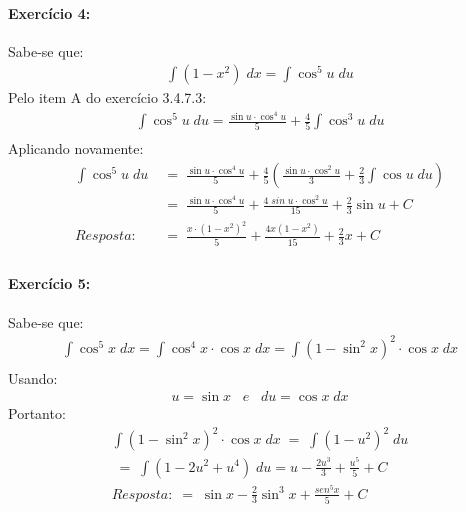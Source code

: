 \documentclass[12pt]{article}
\begin{document}

\paragraph{Exercício 4:}
Sabe-se que:
\begin{align*}\int \left ( 1-x^{2} \right )\; dx = \int \cos^{5}u\; du
\end{align*}
Pelo item A do exercício 3.4.7.3:
\begin{align*}\int \cos^{5}u\; du = \frac{\sin u \cdot \cos^{4}u}{5} + \frac{4}{5}\int\cos^{3}u \;du\\
\end{align*}
Aplicando novamente:
\begin{align*}\int \cos^{5}u\; du
&\;=\; \frac{\sin u \cdot \cos^{4}u}{5} + \frac{4}{5}\left (\frac{\sin u \cdot \cos^{2}u}{3}+\frac{2}{3}\int \cos u \;du  \right )\\
&\;=\; \frac{\sin u \cdot \cos^{4}u}{5} + \frac{4 \; sin\; u \cdot \cos^{2}u}{15}+\frac{2}{3} \sin u + C\\
Resposta: &\;=\;\frac{x\cdot\left ( 1-x^{2} \right )^{2}}{5} + \frac{4x\left ( 1-x^{2} \right )}{15} + \frac{2}{3}x + C\\
\end{align*}


\paragraph{Exercício 5:}
Sabe-se que:
\begin{align*}\int \cos^{5}x\;dx = \int \cos^{4}x\cdot \cos x\; dx = \int \left ( 1-\sin^{2}x \right )^{2}\cdot\cos x \;dx\\
\end{align*}
Usando:
\begin{align*}
u = \sin x \;\;\; e \;\;\; du = \cos x \;dx
\end{align*}
Portanto:
\begin{align*}
\int \left ( 1-\sin^{2}x \right )^{2}\cdot\cos x \; dx \;=\; \int \left ( 1-u^{2} \right )^{2} \;du\\
\;=\; \int \left ( 1-2u^{2} +u^{4} \right )\; du = u -\frac{2u^{3}}{3}+\frac{u^{5}}{5}+C\\
Resposta: \;=\; \sin x - \frac{2}{3} \sin^{3}x + \frac{sen^{5}x}{5} + C\\
\end{align*}
\end{document}
